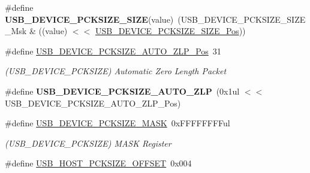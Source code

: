 \begin{DoxyCompactItemize}
\item 
\hypertarget{group___s_a_m_l21___u_s_b_ga20e48aa7acb99e33e791fd4fb5e8322a}{}\#define {\bfseries U\+S\+B\+\_\+\+D\+E\+V\+I\+C\+E\+\_\+\+P\+C\+K\+S\+I\+Z\+E\+\_\+\+S\+I\+Z\+E}(value)~(U\+S\+B\+\_\+\+D\+E\+V\+I\+C\+E\+\_\+\+P\+C\+K\+S\+I\+Z\+E\+\_\+\+S\+I\+Z\+E\+\_\+\+Msk \& ((value) $<$$<$ \hyperlink{group___s_a_m_l21___u_s_b_ga50418bff1c552e987f4925cb91cf32b9}{U\+S\+B\+\_\+\+D\+E\+V\+I\+C\+E\+\_\+\+P\+C\+K\+S\+I\+Z\+E\+\_\+\+S\+I\+Z\+E\+\_\+\+Pos}))\label{group___s_a_m_l21___u_s_b_ga20e48aa7acb99e33e791fd4fb5e8322a}

\item 
\hypertarget{group___s_a_m_l21___u_s_b_ga732b6ff0d44574cf262b94da9a542e0d}{}\#define \hyperlink{group___s_a_m_l21___u_s_b_ga732b6ff0d44574cf262b94da9a542e0d}{U\+S\+B\+\_\+\+D\+E\+V\+I\+C\+E\+\_\+\+P\+C\+K\+S\+I\+Z\+E\+\_\+\+A\+U\+T\+O\+\_\+\+Z\+L\+P\+\_\+\+Pos}~31\label{group___s_a_m_l21___u_s_b_ga732b6ff0d44574cf262b94da9a542e0d}

\begin{DoxyCompactList}\small\item\em (U\+S\+B\+\_\+\+D\+E\+V\+I\+C\+E\+\_\+\+P\+C\+K\+S\+I\+Z\+E) Automatic Zero Length Packet \end{DoxyCompactList}\item 
\hypertarget{group___s_a_m_l21___u_s_b_ga81931185058e5bdc09545fad7b0b23eb}{}\#define {\bfseries U\+S\+B\+\_\+\+D\+E\+V\+I\+C\+E\+\_\+\+P\+C\+K\+S\+I\+Z\+E\+\_\+\+A\+U\+T\+O\+\_\+\+Z\+L\+P}~(0x1ul $<$$<$ U\+S\+B\+\_\+\+D\+E\+V\+I\+C\+E\+\_\+\+P\+C\+K\+S\+I\+Z\+E\+\_\+\+A\+U\+T\+O\+\_\+\+Z\+L\+P\+\_\+\+Pos)\label{group___s_a_m_l21___u_s_b_ga81931185058e5bdc09545fad7b0b23eb}

\item 
\hypertarget{group___s_a_m_l21___u_s_b_ga8137db3f78ef7508a990c6394a11e9db}{}\#define \hyperlink{group___s_a_m_l21___u_s_b_ga8137db3f78ef7508a990c6394a11e9db}{U\+S\+B\+\_\+\+D\+E\+V\+I\+C\+E\+\_\+\+P\+C\+K\+S\+I\+Z\+E\+\_\+\+M\+A\+S\+K}~0x\+F\+F\+F\+F\+F\+F\+F\+Ful\label{group___s_a_m_l21___u_s_b_ga8137db3f78ef7508a990c6394a11e9db}

\begin{DoxyCompactList}\small\item\em (U\+S\+B\+\_\+\+D\+E\+V\+I\+C\+E\+\_\+\+P\+C\+K\+S\+I\+Z\+E) M\+A\+S\+K Register \end{DoxyCompactList}\item 
\hypertarget{group___s_a_m_l21___u_s_b_ga8b233eb580307bb35fcb14e473db9cb0}{}\#define \hyperlink{group___s_a_m_l21___u_s_b_ga8b233eb580307bb35fcb14e473db9cb0}{U\+S\+B\+\_\+\+H\+O\+S\+T\+\_\+\+P\+C\+K\+S\+I\+Z\+E\+\_\+\+O\+F\+F\+S\+E\+T}~0x004\label{group___s_a_m_l21___u_s_b_ga8b233eb580307bb35fcb14e473db9cb0}


\end{DoxyCompactItemize}
